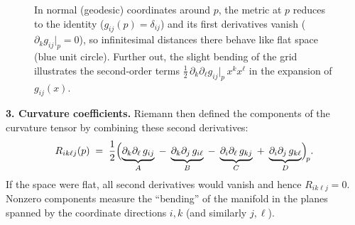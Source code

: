 \begin{figure}[H]
    \centering
    \caption{%
    In normal (geodesic) coordinates around \(p\), the metric at \(p\) reduces to the identity (\(g_{ij}(p)=\delta_{ij}\)) and its first derivatives vanish (\(\partial_k g_{ij}|_p=0\)), so infinitesimal distances there behave like flat space (blue unit circle).  Further out, the slight bending of the grid illustrates the second‐order terms \(\tfrac12\,\partial_k\partial_\ell g_{ij}|_p\,x^k x^\ell\) in the expansion of \(g_{ij}(x)\).}
\end{figure}




\textbf{3. Curvature coefficients.}  
Riemann then defined the components of the curvature tensor by combining these second derivatives:
\[
R_{i k \ell j}(p)
\;=\;
\frac12\Bigl(
\underbrace{\partial_k\partial_\ell\,g_{ij}}_{A}
\;-\;
\underbrace{\partial_k\partial_j\,g_{i\ell}}_{B}
\;-\;
\underbrace{\partial_i\partial_\ell\,g_{kj}}_{C}
\;+\;
\underbrace{\partial_i\partial_j\,g_{k\ell}}_{D}
\Bigr)_{\!p}.
\]
If the space were flat, all second derivatives would vanish and hence \(R_{i k \ell j}=0\).  Nonzero components measure the “bending” of the manifold in the planes spanned by the coordinate directions \(i,k\) (and similarly \(j,\ell\)).


